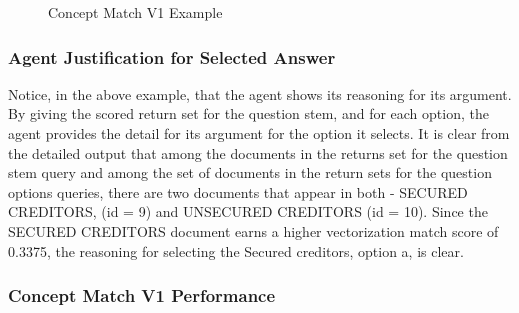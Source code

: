 \begin{figure}
\centering
\vspace{1.0in}
\caption{Concept Match V1 Example}
\label{fig:concept_match_v1_example}
\end{figure}


\subsubsection{Agent Justification for Selected Answer}

Notice, in the above example, that the agent shows its reasoning for its argument.  By giving the scored return set for the question stem, and for each option, the agent provides the detail for its argument for the option it selects.  It is clear from the detailed output that among the documents in the returns set for the question stem query and among the set of documents in the return sets for the question options queries, there are two documents that appear in both - SECURED CREDITORS, (id = 9) and UNSECURED CREDITORS (id = 10).  Since the SECURED CREDITORS document earns a higher vectorization match score of 0.3375, the reasoning for selecting the Secured creditors, option a, is clear.

\subsubsection{Concept Match V1 Performance}

